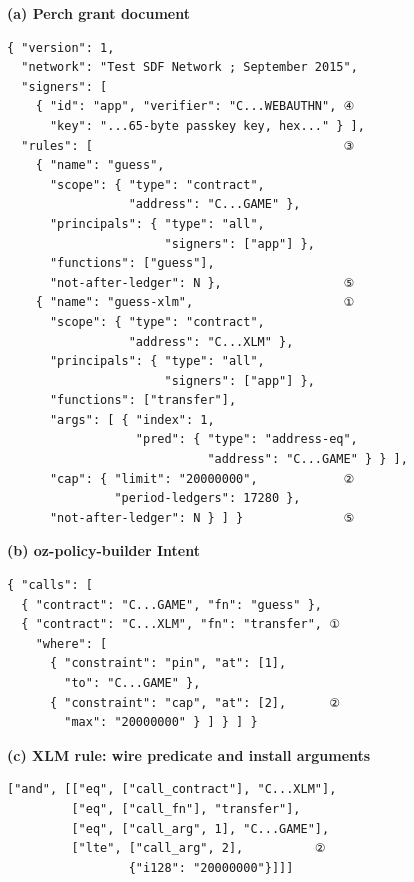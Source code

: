 \begin{figure}[tbp]
\centering
\begin{minipage}[t]{1\linewidth}\footnotesize\textbf{(a) Perch grant document}
\begin{Verbatim}[fontsize=\scriptsize,frame=single,framesep=1.5mm]
{ "version": 1,
  "network": "Test SDF Network ; September 2015",
  "signers": [
    { "id": "app", "verifier": "C...WEBAUTHN", ④
      "key": "...65-byte passkey key, hex..." } ],
  "rules": [                                   ③
    { "name": "guess",
      "scope": { "type": "contract",
                 "address": "C...GAME" },
      "principals": { "type": "all",
                      "signers": ["app"] },
      "functions": ["guess"],
      "not-after-ledger": N },                 ⑤
    { "name": "guess-xlm",                     ①
      "scope": { "type": "contract",
                 "address": "C...XLM" },
      "principals": { "type": "all",
                      "signers": ["app"] },
      "functions": ["transfer"],
      "args": [ { "index": 1,
                  "pred": { "type": "address-eq",
                            "address": "C...GAME" } } ],
      "cap": { "limit": "20000000",            ②
               "period-ledgers": 17280 },
      "not-after-ledger": N } ] }              ⑤
\end{Verbatim}
\end{minipage}\par\medskip
\begin{minipage}[t]{0.49\linewidth}\footnotesize\textbf{(b) oz-policy-builder Intent}
\begin{Verbatim}[fontsize=\scriptsize,frame=single,framesep=1.5mm]
{ "calls": [
  { "contract": "C...GAME", "fn": "guess" },
  { "contract": "C...XLM", "fn": "transfer", ①
    "where": [
      { "constraint": "pin", "at": [1],
        "to": "C...GAME" },
      { "constraint": "cap", "at": [2],      ②
        "max": "20000000" } ] } ] }
\end{Verbatim}
\end{minipage}\hfill
\begin{minipage}[t]{0.49\linewidth}\footnotesize\textbf{(c) XLM rule: wire predicate and install arguments}
\begin{Verbatim}[fontsize=\scriptsize,frame=single,framesep=1.5mm]
["and", [["eq", ["call_contract"], "C...XLM"],
         ["eq", ["call_fn"], "transfer"],
         ["eq", ["call_arg", 1], "C...GAME"],
         ["lte", ["call_arg", 2],          ②
                 {"i128": "20000000"}]]]


\end{Verbatim}
\end{minipage}
\end{figure}
